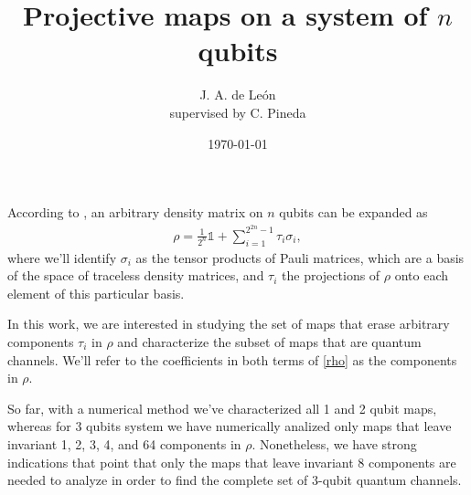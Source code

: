 \documentclass[11pt,dvipsnames]{article}
\begin{document}
\title{Projective maps on a system of $n$ qubits} 
\author{J. A. de León\\
				\small{supervised by C. Pineda}}


\date{\today}  

\maketitle


According to \cite{bengtsson_zyczkowski_2017}, an arbitrary density matrix on $n$  
qubits can be expanded as
\begin{align}
  \rho = \frac{1}{2^n}\mathbb{1} + \sum _{i=1}^{2^{2n}-1}\tau _i\sigma _i,
	\label{rho}
\end{align}
where we'll identify $\sigma _i$ as the tensor products of Pauli 
matrices, which are a basis of the space of traceless density matrices, and 
$\tau_i$ the projections of $\rho$ onto each element of this particular
basis.

In this work, we are interested in studying the set of maps that erase
arbitrary components $\tau_i$ in $\rho$ and characterize the subset of maps
that are quantum channels. We'll refer to the coefficients in both terms of 
\eqref{rho} as the components in $\rho$.

So far, with a numerical method we've characterized all 1 and 2 qubit maps, 
whereas for 3 qubits system we have numerically analized only maps that leave 
invariant 1, 2, 3, 4, and 64 components in $\rho$. Nonetheless, we have strong
indications that point that only the maps that leave invariant 8 components are 
needed to analyze in order to find the complete set of 3-qubit quantum 
channels.
\newline
\end{document}
